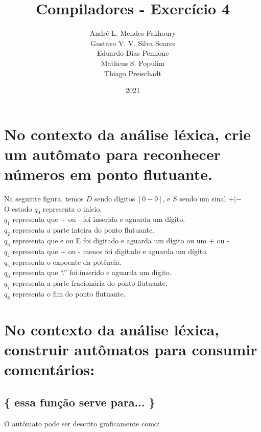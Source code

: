 \documentclass{article}
\title{Compiladores - Exercício 4}
\author{André L. Mendes Fakhoury\\
Gustavo V. V. Silva Soares\\
Eduardo Dias Pennone\\
Matheus S. Populim\\
Thiago Preischadt\\
}
\date{2021}
\begin{document}
\maketitle




\section{No  contexto  da  análise  léxica,  crie  um  autômato  para  reconhecer  números  em  ponto flutuante.}
Na seguinte figura, temos $D$ sendo dígitos $[0-9]$, e $S$ sendo um sinal $+|-$\\
O estado $q_0$ representa o início. \\
$q_1$ representa que + ou - foi inserido e aguarda um dígito. \\
$q_2$ representa a parte inteira do ponto flutuante. \\
$q_3$ representa que e ou E foi digitado e aguarda um dígito ou um + ou -. \\
$q_4$ representa que + ou - menos foi digitado e aguarda um dígito. \\
$q_5$ representa o expoente da potência. \\
$q_6$ representa que “.” foi inserido e aguarda um dígito. \\
$q_7$ representa a parte fracionária do ponto flutuante. \\
$q_8$ representa o fim do ponto flutuante.\\






\section{No contexto da análise léxica, construir autômatos para consumir comentários:}

\subsection{\{ essa função serve para... \}}

O autômato pode ser descrito graficamente como:
\end{document}
